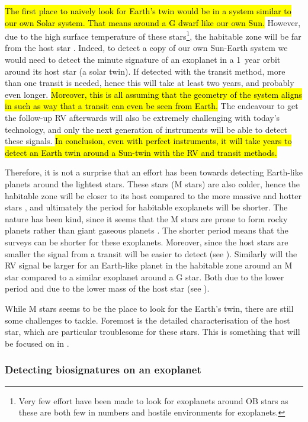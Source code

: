 \hl{The first place to naively look for Earth's twin would be in a system similar to our own Solar
system. That means around a G dwarf like our own Sun.} However, due to the high surface temperature
of these stars\footnote{Very few effort have been made to look for exoplanets around OB stars as
these are both few in numbers and hostile environments for exoplanets.}, the habitable zone will be
far from the host star \citep[see e.g.][]{Kasting1993}. Indeed, to detect a copy of our own
Sun-Earth system we would need to detect the minute signature of an exoplanet in a \SI{1}{year}
orbit around its host star (a solar twin). If detected with the transit method, more than one
transit is needed, hence this will take at least two years, and probably even longer. \hl{Moreover,
this is all assuming that the geometry of the system aligns in such as way that a transit can even
be seen from Earth.} The endeavour to get the follow-up RV afterwards will also be extremely
challenging with today's technology, and only the next generation of instruments will be able to
detect these signals. \hl{In conclusion, even with perfect instruments, it will take years to detect
an Earth twin around a Sun-twin with the RV and transit methods.}

Therefore, it is not a surprise that an effort has been towards detecting Earth-like planets around
the lightest stars. These stars (M stars) are also colder, hence the habitable zone will be closer
to its host compared to the more massive and hotter stars \citep{Kasting1997}, and ultimately the
period for habitable exoplanets will be shorter. The nature has been kind, since it seems that the M
stars are prone to form rocky planets rather than giant gaseous planets
\citep{Bonfils2013,Delfosse2013}. The shorter period means that the surveys can be shorter for these
exoplanets. Moreover, since the host stars are smaller the signal from a transit will be easier to
detect (see ). Similarly will the RV signal be larger for an Earth-like planet in
the habitable zone around an M star compared to a similar exoplanet around a G star. Both due to the
lower period and due to the lower mass of the host star (see ).

While M stars seems to be the place to look for the Earth's twin, there are still some challenges to
tackle. Foremost is the detailed characterisation of the host star, which are particular troublesome
for these stars. This is something that will be focused on in .

\subsubsection{Detecting biosignatures on an exoplanet}

